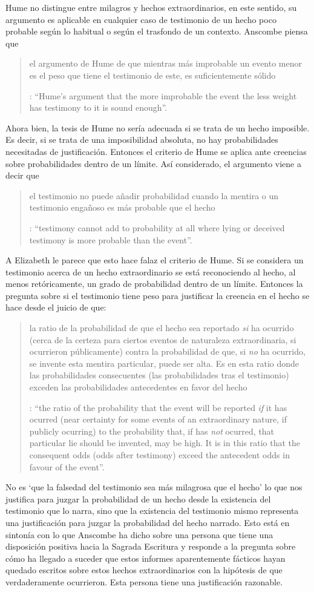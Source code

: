 Hume no distingue entre milagros y hechos extraordinarios, en este sentido, su argumento es aplicable en cualquier caso de testimonio de un hecho poco probable según lo habitual o según el trasfondo de un contexto. Anscombe piensa que \blockquote[{\Cite[47]{anscombe2008faith:hummi}}: \enquote{Hume's argument that the more improbable the event the less weight has testimony to it is sound enough}.]{el argumento de Hume de que mientras más improbable un evento menor es el peso que tiene el testimonio de este, es suficientemente sólido}. Ahora bien, la tesis de Hume no sería adecuada si se trata de un hecho imposible. Es decir, si se trata de una imposibilidad absoluta, no hay probabilidades necesitadas de justificación. Entonces el criterio de Hume se aplica ante creencias sobre probabilidades dentro de un límite. Así considerado, el argumento viene a decir que \blockquote[{\Cite[47]{anscombe2008faith:hummi}}: \enquote{testimony cannot add to probability at all where lying or deceived testimony is more probable than the event}.]{el testimonio no puede añadir probabilidad cuando la mentira o un testimonio engañoso es más probable que el hecho}. A Elizabeth le parece que esto hace falaz el criterio de Hume. Si se considera un testimonio acerca de un hecho extraordinario se está reconociendo al hecho, al menos retóricamente, un grado de probabilidad dentro de un límite. Entonces la pregunta sobre si el testimonio tiene peso para justificar la creencia en el hecho se hace desde el juicio de que: \blockquote[{\Cite[47]{anscombe2008faith:hummi}}: \enquote{the ratio of the probability that the event will be reported \emph{if} it has ocurred (near certainty for some events of an extraordinary nature, if publicly ocurring) to the probability that, if has \emph{not} ocurred, that particular lie should be invented, may be high. It is in this ratio that the consequent odds (odds after testimony) exceed the antecedent odds in favour of the event}.]{la ratio de la probabilidad de que el hecho sea reportado \emph{si} ha ocurrido (cerca de la certeza para ciertos eventos de naturaleza extraordinaria, si ocurrieron públicamente) contra la probabilidad de que, si \emph{no} ha ocurrido, se invente esta mentira particular, puede ser alta. Es en esta ratio donde las probabilidades consecuentes (las probabilidades tras el testimonio) exceden las probabilidades antecedentes en favor del hecho}. No es \enquote*{que la falsedad del testimonio sea más milagrosa que el hecho} lo que nos justifica para juzgar la probabilidad de un hecho desde la existencia del testimonio que lo narra, sino que la existencia del testimonio mismo representa una justificación para juzgar la probabilidad del hecho narrado. Esto está en sintonía con lo que Anscombe ha dicho sobre una persona que tiene una disposición positiva hacia la Sagrada Escritura y responde a la pregunta sobre cómo ha llegado a suceder que estos informes aparentemente fácticos hayan quedado escritos sobre estos hechos extraordinarios con la hipótesis de que verdaderamente ocurrieron. Esta persona tiene una justificación razonable.
